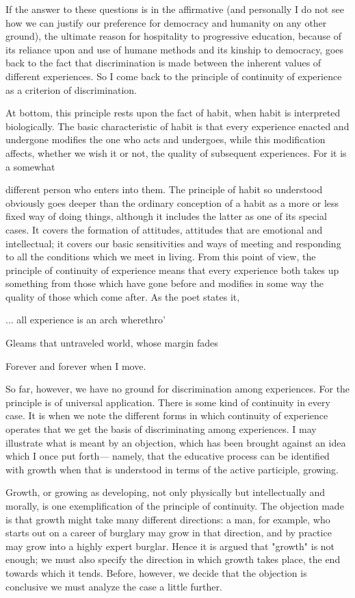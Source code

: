 If the answer to these questions is in the affirmative (and personally I do not see how 
we can justify our preference for democracy and humanity on any other ground), the 
ultimate reason for hospitality to progressive education, because of its reliance upon and 
use of humane methods and its kinship to democracy, goes back to the fact that 
discrimination is made between the inherent values of different experiences. So I come 
back to the principle of continuity of experience as a criterion of discrimination. 

At bottom, this principle rests upon the fact of habit, when habit is interpreted 
biologically. The basic characteristic of habit is that every experience enacted and 
undergone modifies the one who acts and undergoes, while this modification affects, 
whether we wish it or not, the quality of subsequent experiences. For it is a somewhat 



different person who enters into them. The principle of habit so understood obviously 
goes deeper than the ordinary conception of a habit as a more or less fixed way of doing 
things, although it includes the latter as one of its special cases. It covers the formation of 
attitudes, attitudes that are emotional and intellectual; it covers our basic sensitivities and 
ways of meeting and responding to all the conditions which we meet in living. From this 
point of view, the principle of continuity of experience means that every experience both 
takes up something from those which have gone before and modifies in some way the 
quality of those which come after. As the poet states it, 

... all experience is an arch wherethro' 

Gleams that untraveled world, whose margin fades 

Forever and forever when I move. 

So far, however, we have no ground for discrimination among experiences. For the 
principle is of universal application. There is some kind of continuity in every case. It is 
when we note the different forms in which continuity of experience operates that we get 
the basis of discriminating among experiences. I may illustrate what is meant by an 
objection, which has been brought against an idea which I once put forth— namely, that 
the educative process can be identified with growth when that is understood in terms of 
the active participle, growing. 

Growth, or growing as developing, not only physically but intellectually and morally, 
is one exemplification of the principle of continuity. The objection made is that growth 
might take many different directions: a man, for example, who starts out on a career of 
burglary may grow in that direction, and by practice may grow into a highly expert 
burglar. Hence it is argued that "growth" is not enough; we must also specify the 
direction in which growth takes place, the end towards which it tends. Before, however, 
we decide that the objection is conclusive we must analyze the case a little further. 


